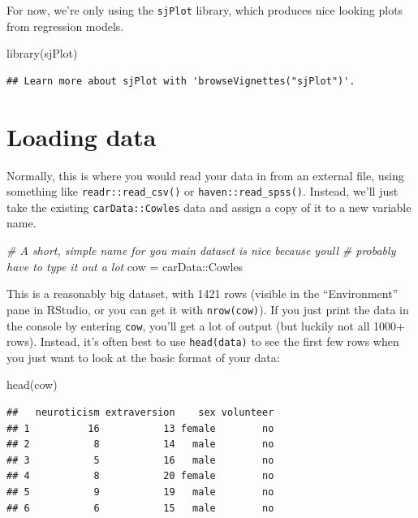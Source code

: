 \documentclass[
]{book}
\newenvironment{Shaded}{\begin{snugshade}}{\end{snugshade}}
\newcommand{\CommentTok}[1]{\textcolor[rgb]{0.56,0.35,0.01}{\textit{#1}}}
\newcommand{\FunctionTok}[1]{\textcolor[rgb]{0.00,0.00,0.00}{#1}}
\newcommand{\NormalTok}[1]{#1}
\newcommand{\OtherTok}[1]{\textcolor[rgb]{0.56,0.35,0.01}{#1}}
\newcommand{\SpecialCharTok}[1]{\textcolor[rgb]{0.00,0.00,0.00}{#1}}
\begin{document}
For now, we're only using the \texttt{sjPlot} library, which produces
nice looking plots from regression models.

\begin{Shaded}
\begin{Highlighting}[]
\FunctionTok{library}\NormalTok{(sjPlot)}
\end{Highlighting}
\end{Shaded}

\begin{verbatim}
## Learn more about sjPlot with 'browseVignettes("sjPlot")'.
\end{verbatim}

\hypertarget{loading-data}{%
\section{Loading data}\label{loading-data}}

Normally, this is where you would read your data in from an external
file, using something like \texttt{readr::read\_csv()} or \texttt{haven::read\_spss()}.
Instead, we'll just take the existing \texttt{carData::Cowles} data and
assign a copy of it to a new variable name.

\begin{Shaded}
\begin{Highlighting}[]
\CommentTok{\# A short, simple name for you main dataset is nice because you\textquotesingle{}ll}
\CommentTok{\#   probably have to type it out a lot}
\NormalTok{cow }\OtherTok{=}\NormalTok{ carData}\SpecialCharTok{::}\NormalTok{Cowles}
\end{Highlighting}
\end{Shaded}

This is a reasonably big dataset, with 1421 rows (visible in the ``Environment''
pane in RStudio, or you can get it with \texttt{nrow(cow)}). If you just print
the data in the console by entering \texttt{cow}, you'll get a lot of output
(but luckily not all 1000+ rows). Instead, it's often best to use
\texttt{head(data)} to see the first few rows when you just want to look at the
basic format of your data:

\begin{Shaded}
\begin{Highlighting}[]
\FunctionTok{head}\NormalTok{(cow)}
\end{Highlighting}
\end{Shaded}

\begin{verbatim}
##   neuroticism extraversion    sex volunteer
## 1          16           13 female        no
## 2           8           14   male        no
## 3           5           16   male        no
## 4           8           20 female        no
## 5           9           19   male        no
## 6           6           15   male        no
\end{verbatim}
\end{document}
